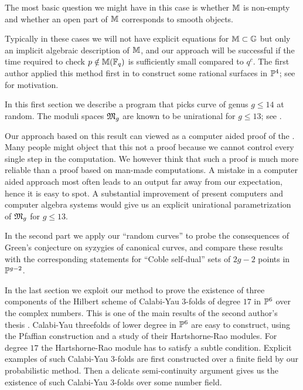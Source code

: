 The most basic question we might have in this case is whether ${\mathbb M}$ is 
non-empty and whether an open part of ${\mathbb M}$ corresponds to smooth objects.

Typically in these cases
we will not have explicit equations for ${\mathbb M} \subset {\mathbb G}$
but only an implicit algebraic description of ${\mathbb M}$, and our approach will
be successful if the time required to check $p \notin {\mathbb M}({\mathbb F}_q)$ is sufficiently
small compared to $q^c$.
The first author applied this method first in \cite{CO:Sch1} to construct some
rational surfaces in ${\mathbb P}^4$; see \cite{CO:ElPe,CO:DS} for motivation.


In this first section we describe a program that picks curve of genus
$g \le 14$ at random. The moduli spaces $\mathfrak M_g$ are known to be unirational
for $g\le 13$; see \cite{CO:Se,CO:CR}.

Our approach based on this result
can viewed as a computer aided proof of the . 
Many people might object 
that this not a proof because we cannot control every single step in the
computation. We however think that such a proof is much more reliable than
a proof based on man-made computations.
A mistake in a computer aided approach most often leads to an output far 
away from our expectation, hence it is easy to spot.  
A substantial improvement of present computers and computer algebra systems 
would give us an explicit unirational parametrization of $\mathfrak M_g$ for $g\le 13$.
\medskip

In the second part we apply our ``random curves'' to probe the consequences 
of Green's conjecture on syzygies of canonical curves, 
and compare these results with the corresponding statements for 
``Coble self-dual'' sets of $2g-2$ points in ${\mathbb P}^{g-2}$. 
\medskip

In the last section we exploit our method to prove the existence 
of three components of the Hilbert scheme of Calabi-Yau 3-folds of degree $17$ 
in ${\mathbb P}^6$ over the complex numbers. 
This is one of the  main results of the second author's thesis
\cite[Chapter 4]{CO:To}. 
Calabi-Yau threefolds of lower degree in ${\mathbb P}^6$ are easy to construct, 
using the Pfaffian construction and a study of their Hartshorne-Rao modules.
For degree $17$ the Hartshorne-Rao module has to satisfy a subtle condition. 
Explicit examples of such Calabi-Yau 3-folds are first 
constructed over a finite field by our probabilistic method.
Then a delicate semi-continuity argument gives us the existence of such Calabi-Yau 3-folds
over some number field.


